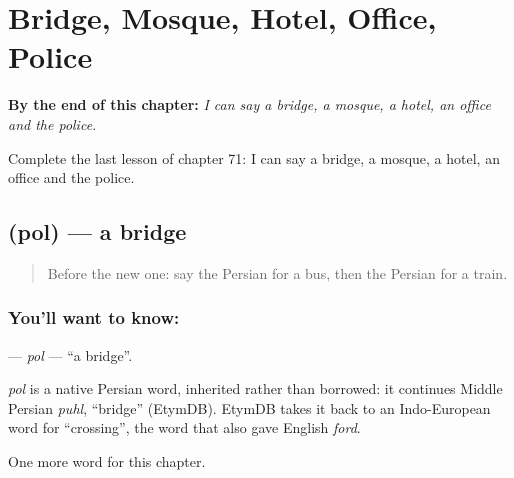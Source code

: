 
\chapter{Bridge, Mosque, Hotel, Office, Police}
\label{ch:fa-bridge-mosque-hotel-office-police}

\begin{chapteropening}
\textbf{By the end of this chapter:} \emph{I can say a bridge, a mosque, a hotel, an office and the police.}

Complete the last lesson of chapter 71: I can say a bridge, a mosque, a hotel, an office and the police.
\end{chapteropening}

\section[\texorpdfstring{\fa{پل} (pol)}{پل (pol)}]{ (pol) — a bridge}

\label{lesson:FA-C71-pol}



\begin{quote}
Before the new one: say the Persian for a bus, then the Persian for a train.
\end{quote}

\subsection*{You'll want to know: }
\textbf{} — \emph{pol} — \textquotedblleft{}a bridge\textquotedblright{}.

\begin{cousinweb}
\emph{pol} is a native Persian word, inherited rather than borrowed: it continues Middle Persian \emph{puhl}, \textquotedblleft{}bridge\textquotedblright{} (EtymDB). EtymDB takes it back to an Indo-European word for \textquotedblleft{}crossing\textquotedblright{}, the word that also gave English \emph{ford}.
\end{cousinweb}

\begin{grammarlens}[title={What you've built}]
One more word for this chapter.
\end{grammarlens}

